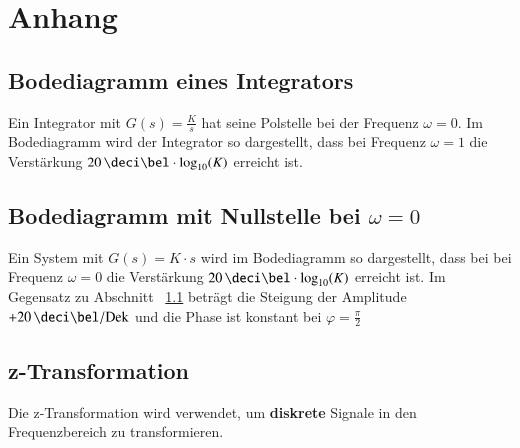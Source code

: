 \section{Anhang}

\subsection{Bodediagramm eines Integrators}
\label{Bodediagramm eines Integrators}

Ein Integrator mit $G(s) = \frac{K}{s}$ hat seine Polstelle bei der Frequenz $\omega = 0$. Im Bodediagramm wird der Integrator so
dargestellt, dass bei Frequenz $\omega = 1$ die Verstärkung $20 \, \deci \bel \cdot \log_{10}(K)$ erreicht ist.



\subsection[Bodediagramm mit Nullstelle bei omega = 0]{Bodediagramm mit Nullstelle bei $\omega = 0$}

Ein System mit $G(s) = K \cdot s$ wird im Bodediagramm so dargestellt, dass bei bei Frequenz $\omega = 0$ die Verstärkung
$20 \, \deci \bel \cdot \log_{10}(K)$ erreicht ist. Im Gegensatz zu Abschnitt ~\ref{Bodediagramm eines Integrators} beträgt die Steigung
der Amplitude $+20 \, \deci \bel / \mathrm{Dek}$ und die Phase ist konstant bei $\varphi = \frac{\pi}{2}$


\subsection{z-Transformation}
\label{z-Transformation}

Die z-Transformation wird verwendet, um \textbf{diskrete} Signale in den Frequenzbereich zu transformieren.



